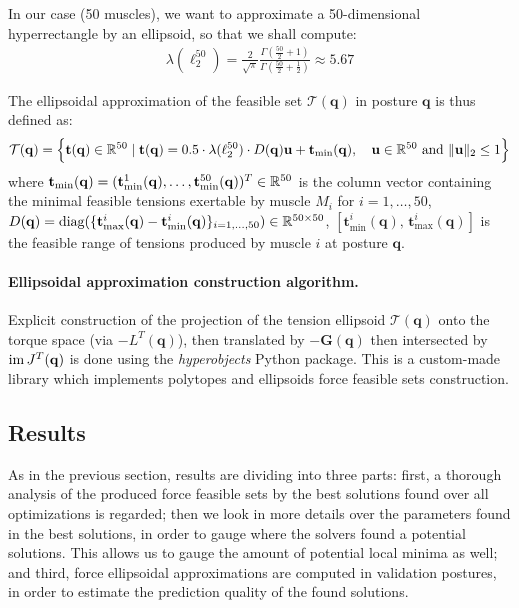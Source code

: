 In our case (50 muscles), we want to approximate a 50-dimensional hyperrectangle by an ellipsoid, so that we shall compute:
\begin{align*}
    \lambda(\ell_2^{50}) = \frac{2}{\sqrt{\pi}}\frac{\Gamma(\frac{50}{2} + 1)}{\Gamma(\frac{50}{2} + \frac{1}{2})} \approx 5.67
\end{align*}

The ellipsoidal approximation of the feasible set $\mathcal{T}(\mathbf{q})$ in posture $\mathbf{q}$ is thus defined as: 
\begin{align*}
    \mathcal{T}(\mathbf{q}) = \left\{ \mathbf{t}(\mathbf{q})\in \mathbb{R}^{50} \mid \mathbf{t}(\mathbf{q}) = 0.5\cdot \lambda(\ell_2^{50}) \cdot D(\mathbf{q})\mathbf{u} + \mathbf{t}_{\text{min}}(\mathbf{q}), \quad \mathbf{u}\in\mathbb{R}^{50} \text{ and } \|\mathbf{u}\|_2 \leq 1 \right\} 
\end{align*}
where $\mathbf{t}_{\text{min}}(\mathbf{q}) = (\mathbf{t}^1_{\text{min}}(\mathbf{q}), \dots, \mathbf{t}^{50}_{\text{min}}(\mathbf{q}))^T \in \mathbb{R}^{50}$ is the column vector containing the minimal feasible tensions exertable by muscle $M_i$ for $i=1,\dots, 50$, $D(\mathbf{q}) = \text{diag}(\{\mathbf{t}^i_{\text{\text{max}}}(\mathbf{q}) - \mathbf{t}^i_{\text{\text{min}}}(\mathbf{q})\}_{i=1,\dots, 50}) \in \mathbb{R}^{50\times 50}$, $[\mathbf{t}^i_{\text{min}}(\mathbf{q}),\, \mathbf{t}^i_{\text{max}}(\mathbf{q})]$ is the feasible range of tensions produced by muscle $i$ at posture $\mathbf{q}$. 




\paragraph*{Ellipsoidal approximation construction algorithm.}
Explicit construction of the projection of the tension ellipsoid $\mathcal{T}(\mathbf{q})$ onto the torque space (via $-L^T(\mathbf{q})$), then translated by $-\mathbf{G}(\mathbf{q})$ then intersected by $\operatorname{im}{J^T(\mathbf{q})}$ is done using the \emph{hyperobjects} Python package. This is a custom-made library which implements polytopes and ellipsoids force feasible sets construction.

\subsection{Results}
As in the previous section, results are dividing into three parts: first, a thorough analysis of the produced force feasible sets by the best solutions found over all optimizations is regarded; then we look in more details over the parameters found in the best solutions, in order to gauge where the solvers found a potential solutions. This allows us to gauge the amount of potential local minima as well; and third, force ellipsoidal approximations are computed in validation postures, in order to estimate the prediction quality of the found solutions.

